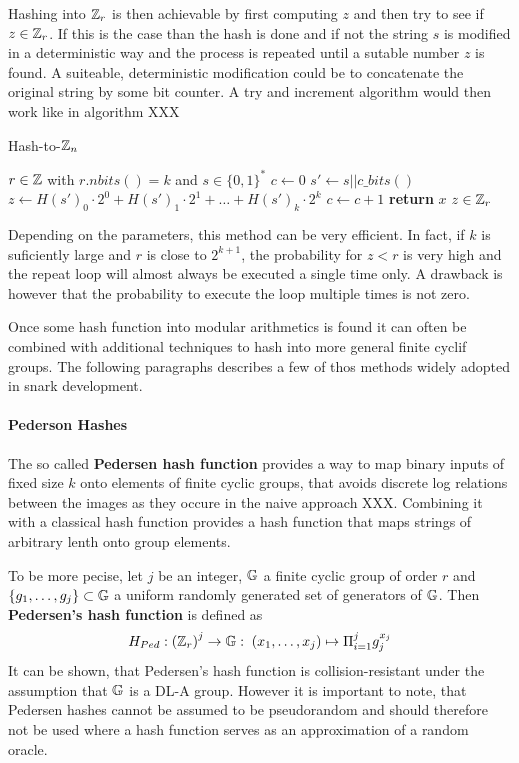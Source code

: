 Hashing into $\mathbb{Z}_r$ is then achievable by first computing $z$ and then try to see if $z\in\mathbb{Z}_r$. If this is the case than the hash is done and if not the string $s$ is modified in a deterministic way and the process is repeated until a sutable number $z$ is found. A suiteable, deterministic modification could be to concatenate the original string by some bit counter. A try and increment algorithm would then work like in algorithm XXX
\begin{algorithm}\caption{Hash-to-$\mathbb{Z}_n$}
\label{alg_projective_group_law}
\begin{algorithmic}[0]
\Require $r \in \mathbb{Z}$ with $r.nbits()=k$ and $s\in\{0,1\}^*$
\State $c \gets 0$
\Repeat
\State $s' \gets s||c\_bits()$
\State $z \gets H(s')_0\cdot 2^0 + H(s')_1\cdot 2^1 + \ldots + H(s')_{k}\cdot 2^{k}$
\State $c\gets c+1$
\State \textbf{return} $x$
\EndProcedure
\Ensure $ z\in \mathbb{Z}_r$
\end{algorithmic}
\end{algorithm}

Depending on the parameters, this method can be very efficient. In fact, if $k$ is suficiently large and $r$ is close to $2^{k+1}$, the probability for $z<r$ is very high and the repeat loop will almost always be executed a single time only. A drawback is however that the probability to execute the loop multiple times is not zero. 

Once some hash function into modular arithmetics is found it can often be combined with additional techniques to hash into more general finite cyclif groups. The following paragraphs describes a few of thos methods widely adopted in snark development.
\paragraph{Pederson Hashes}
The so called \textbf{Pedersen hash function} provides a way to map binary inputs of fixed size $k$ onto elements of finite cyclic groups, that avoids discrete log relations between the images as they occure in the naive approach XXX. Combining it with a classical hash function provides a hash function that maps strings of arbitrary lenth onto group elements. 

To be more pecise, let $j$ be an integer, $\mathbb{G}$ a finite cyclic group of order $r$ and $\{g_1, \ldots, g_j\} \subset \mathbb{G}$ a uniform randomly generated set of generators of $\mathbb{G}$. Then \textbf{Pedersen’s hash function} is defined as
\begin{equation}
H_{Ped} : \left(\mathbb{Z}_r\right)^j \to \mathbb{G}:\; (x_1,\ldots,x_j)\mapsto \Pi_{i=1}^j g_j^{x_j}
\end{equation}
It can be shown, that Pedersen’s  hash  function  is  collision-resistant under the assumption that $\mathbb{G}$ is a DL-A group. However it is important to note, that Pedersen hashes cannot be assumed to be pseudorandom and should therefore not be used where a hash function serves as an approximation of a random oracle.

